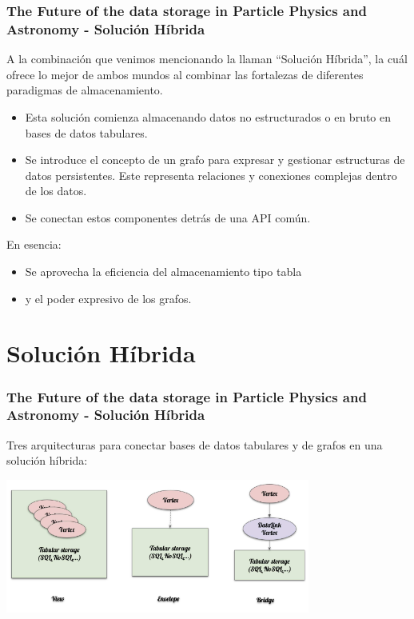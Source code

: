\begin{frame}
    \frametitle{The Future of the data storage in Particle Physics and Astronomy - Solución Híbrida}

    A la combinación que venimos mencionando la llaman ``Solución Híbrida'', la cuál ofrece lo mejor de ambos mundos al combinar las fortalezas de diferentes paradigmas de almacenamiento.

      

    \begin{itemize}
        \item Esta solución comienza almacenando datos no estructurados o en bruto en bases de datos tabulares.

          
        
        \item Se introduce el concepto de un grafo para expresar y gestionar estructuras de datos persistentes. Este representa relaciones y conexiones complejas dentro de los datos.

         

        \item Se conectan estos componentes detrás de una API común.
    \end{itemize}

     

    En esencia:

    \begin{itemize}
        \item Se aprovecha la eficiencia del almacenamiento tipo tabla
        \item y el poder expresivo de los grafos.
    \end{itemize}
    
\end{frame}

\section{Solución Híbrida}

\begin{frame}
    \frametitle{The Future of the data storage in Particle Physics and Astronomy - Solución Híbrida}

    Tres arquitecturas para conectar bases de datos tabulares y de grafos en una solución híbrida:
    
    \begin{center}
        \includegraphics[width=0.75\textwidth]{images/multidb-1.png}
    \end{center}

\end{frame}

